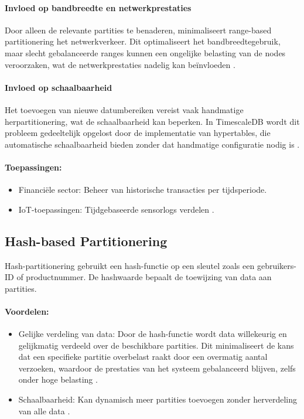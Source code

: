 \paragraph{Invloed op bandbreedte en netwerkprestaties} 
Door alleen de relevante partities te benaderen, minimaliseert range-based partitionering het netwerkverkeer. Dit optimaliseert het bandbreedtegebruik, maar slecht gebalanceerde ranges kunnen een ongelijke belasting van de nodes veroorzaken, wat de netwerkprestaties nadelig kan beïnvloeden \autocite{Mahmud2020}.
 
\paragraph{Invloed op schaalbaarheid} 
Het toevoegen van nieuwe datumbereiken vereist vaak handmatige herpartitionering, wat de schaalbaarheid kan beperken. In TimescaleDB wordt dit probleem gedeeltelijk opgelost door de implementatie van hypertables, die automatische schaalbaarheid bieden zonder dat handmatige configuratie nodig is \autocite{Mahmud2020}.
 
\paragraph{Toepassingen:}
\begin{itemize}
    \item Financiële sector: Beheer van historische transacties per tijdsperiode.
    \item IoT-toepassingen: Tijdgebaseerde sensorlogs verdelen \autocite{Mahmud2020}.
\end{itemize}
 
\subsection{Hash-based Partitionering}
Hash-partitionering gebruikt een hash-functie op een sleutel zoals een gebruikers-ID of productnummer. De hashwaarde bepaalt de toewijzing van data aan partities.
 
\paragraph{Voordelen:}
\begin{itemize}
    \item Gelijke verdeling van data: Door de hash-functie wordt data willekeurig en gelijkmatig verdeeld over de beschikbare partities. Dit minimaliseert de kans dat een specifieke partitie overbelast raakt door een overmatig aantal verzoeken, waardoor de prestaties van het systeem gebalanceerd blijven, zelfs onder hoge belasting \autocite{Ponnusamy2024,Mahmud2020}.
    \item Schaalbaarheid: Kan dynamisch meer partities toevoegen zonder herverdeling van alle data \autocite{Mahmud2020}.
\end{itemize}
 
